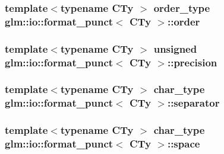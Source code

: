 \subsubsection[{order}]{\setlength{\rightskip}{0pt plus 5cm}template$<$typename C\+Ty $>$ {\bf order\+\_\+type} {\bf glm\+::io\+::format\+\_\+punct}$<$ C\+Ty $>$\+::{\bf order}}\label{classglm_1_1io_1_1format__punct_a9de1f3b7120a036ec0ab394d2036d0aa}
\hypertarget{classglm_1_1io_1_1format__punct_a5a15d396b7c963df9dec5e124236dc02}{}
\subsubsection[{precision}]{\setlength{\rightskip}{0pt plus 5cm}template$<$typename C\+Ty $>$ unsigned {\bf glm\+::io\+::format\+\_\+punct}$<$ C\+Ty $>$\+::{\bf precision}}\label{classglm_1_1io_1_1format__punct_a5a15d396b7c963df9dec5e124236dc02}
\hypertarget{classglm_1_1io_1_1format__punct_ac561eb04fc2a1282ef38ea15f8e640ee}{}
\subsubsection[{separator}]{\setlength{\rightskip}{0pt plus 5cm}template$<$typename C\+Ty $>$ char\+\_\+type {\bf glm\+::io\+::format\+\_\+punct}$<$ C\+Ty $>$\+::separator}\label{classglm_1_1io_1_1format__punct_ac561eb04fc2a1282ef38ea15f8e640ee}
\hypertarget{classglm_1_1io_1_1format__punct_adf9a915938727793de1daca07dcdfa4e}{}
\subsubsection[{space}]{\setlength{\rightskip}{0pt plus 5cm}template$<$typename C\+Ty $>$ char\+\_\+type {\bf glm\+::io\+::format\+\_\+punct}$<$ C\+Ty $>$\+::space}\label{classglm_1_1io_1_1format__punct_adf9a915938727793de1daca07dcdfa4e}
\hypertarget{classglm_1_1io_1_1format__punct_a95d32ca2330bbf7c50d3e066b7a851db}{}
